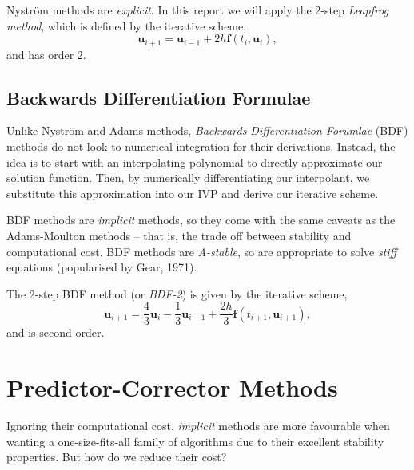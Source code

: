 \documentclass[12pt, twoside]{report}
\theoremstyle{plain}
\theoremstyle{definition}
\theoremstyle{definition}
\begin{document}
            Nystr\"om methods are \textit{explicit}. In this report we will 
            apply the 2-step \textit{Leapfrog method}, which is defined by the 
            iterative scheme,
            \begin{equation}
            \label{eq:leapfrog}
                \mathbf{u}_{i+1} = \mathbf{u}_{i-1} + 2h\mathbf{f}(t_i, 
                \mathbf{u}_i),
            \end{equation}
            and has order 2.

        \subsection{Backwards Differentiation Formulae}
        \label{2_bdf}
            Unlike Nystr\"om and Adams methods, \textit{Backwards 
            Differentiation Forumlae} (BDF) methods do not look to numerical
            integration for their derivations. Instead, the idea is to 
            start with an interpolating polynomial to directly approximate 
            our solution function. Then, by numerically differentiating our
            interpolant, we substitute this approximation into our IVP and 
            derive our iterative scheme. 

            BDF methods are \textit{implicit} methods, so they come with the 
            same caveats as the Adams-Moulton methods -- that is, the trade off
            between stability and computational cost. BDF methods are 
            \textit{A-stable}, so are appropriate to solve \textit{stiff} 
            equations (popularised by Gear, 1971). 

            The 2-step BDF method (or \textit{BDF-2}) is given by the 
            iterative scheme,
            \begin{equation}
            \label{eq:2_bdf2}
                \mathbf{u}_{i+1} = \frac{4}{3}\mathbf{u}_i - 
                \frac{1}{3}\mathbf{u}_{i-1} + 
                \frac{2h}{3}\mathbf{f}(t_{i+1}, \mathbf{u}_{i+1}),
            \end{equation}
            and is second order.


    \section{Predictor-Corrector Methods}
    \label{2_predictor_correctors}
        Ignoring their computational cost, \textit{implicit} methods are more
        favourable when wanting a one-size-fits-all family of algorithms due 
        to their excellent stability properties. But how do we reduce their
        cost?
\end{document}
